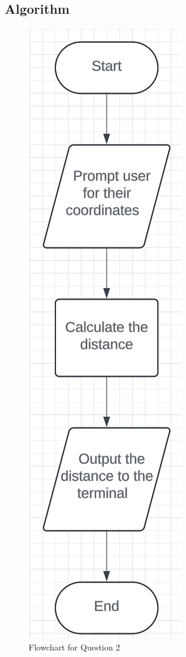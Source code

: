 \documentclass{article}
\begin{document}
\begin{flushleft}
	\section{Algorithm}
	\begin{figure}[!h]
		\begin{centering}
			\includegraphics[scale=0.45]{Q2flowchart.png}
			\caption{Flowchart for Question 2}
		\end{centering}
	\end{figure}

\end{flushleft}
\end{document}
